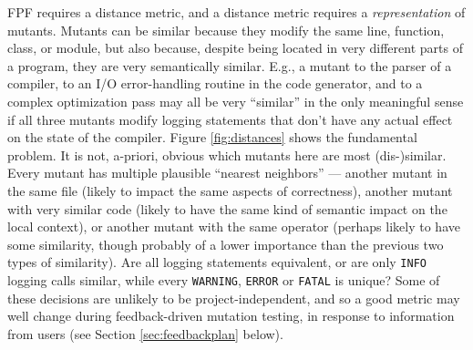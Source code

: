 FPF requires a distance metric, and a distance metric requires a
\emph{representation} of mutants.  Mutants can be similar because they
modify the same line, function, class, or module, but also because,
despite being located in very different parts of a program, they are
very semantically similar.  E.g., a mutant to the parser of a compiler, to
an I/O error-handling routine in the code generator, and to a complex
optimization pass may all be very ``similar'' in the only meaningful
sense if all three mutants modify logging statements that don't have
any actual effect on the state of the compiler.  Figure
\ref{fig:distances} shows the fundamental problem.  It is not,
a-priori, obvious which mutants here are most (dis-)similar.  Every
mutant has multiple plausible ``nearest neighbors'' --- another mutant
in the same file (likely to impact the same aspects of correctness),
another mutant with very similar code (likely to have the same kind of
semantic impact on the local context), or another mutant with the same operator (perhaps
likely to have some similarity, though probably of a lower importance
than the previous two types of similarity).  Are all logging statements
equivalent, or are only {\tt INFO} logging calls similar, while every
{\tt WARNING}, {\tt ERROR} or {\tt FATAL} is unique?  Some of these
decisions are unlikely to be project-independent, and so a good metric
may well change during feedback-driven mutation testing, in response
to information from users (see Section \ref{sec:feedbackplan} below).

